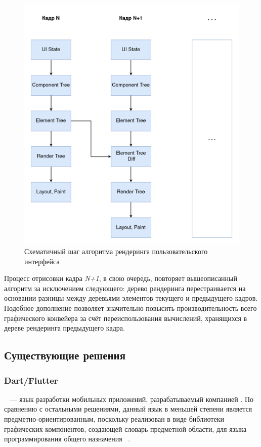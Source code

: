 \begin{figure}[h]
\centering
\includegraphics[width=\linewidth,height=0.9\linewidth,keepaspectratio]{resources/ui-render-pipeline.png}
\caption{Схематичный шаг алгоритма рендеринга пользовательского интерфейса}
\label{render-pipeline}
\end{figure}

Процесс отрисовки кадра \textit{N+1}, в свою очередь, повторяет
вышеописанный алгоритм за исключением следующего: дерево рендеринга
перестраивается на основании разницы между деревьями элементов текущего и
предыдущего кадров.
Подобное дополнение позволяет значительно повысить производительность
всего графического конвейера за счёт переиспользования вычислений,
хранящихся в дереве рендеринга предыдущего кадра.


\subsection{Существующие решения}
\subsubsection*{Dart/Flutter}
~\cite{flutter-homepage} --- язык разработки
мобильных приложений, разрабатываемый компанией . По
сравнению с остальными решениями, данный язык в меньшей степени является
предметно-ориентированным, поскольку реализован в виде библиотеки
графических компонентов, создающей словарь предметной области, для языка
программирования общего назначения ~\cite{dart-homepage}.

